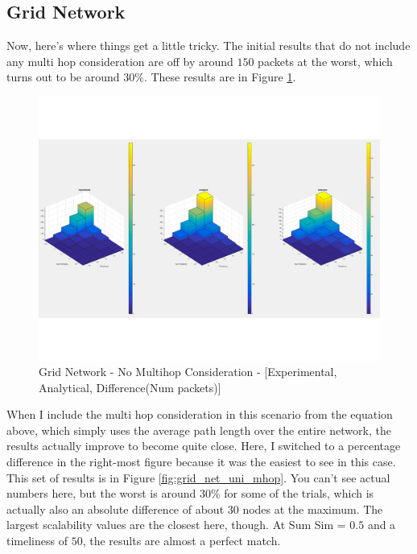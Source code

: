 \documentclass[conference]{IEEEtran}
\begin{document}
\subsection{Grid Network}
Now, here's where things get a little tricky.  The initial results that do not include any multi hop consideration are off by around $150$ packets at the worst, which turns out to be around $30\%$.  These results are in Figure \ref{fig:grid_net_uni_no_mhop}.
\begin{figure}
    \includegraphics[scale=0.65]{result_expl_figs/grid_IS_100_CR_2.pdf}
    \caption{Grid Network - No Multihop Consideration - [Experimental, Analytical, Difference(Num packets)]}
    \label{fig:grid_net_uni_no_mhop}
\end{figure}

When I include the multi hop consideration in this scenario from the equation above, which simply uses the average path length over the entire network, the results actually improve to become quite close.  Here, I switched to a percentage difference in the right-most figure because it was the easiest to see in this case.  This set of results is in Figure \ref{fig:grid_net_uni_mhop}.  You can't see actual numbers here, but the worst is around 30\% for some of the trials, which is actually also an absolute difference of about 30 nodes at the maximum.  The largest scalability values are the closest here, though.  At Sum Sim = $0.5$ and a timeliness of $50$, the results are almost a perfect match.
\end{document}
